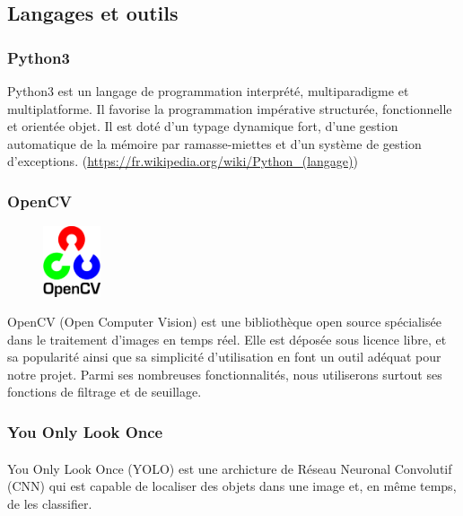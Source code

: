 \documentclass[a4paper]{article}
\begin{document}
		\subsection{Langages et outils}
			\subsubsection{Python3}
				Python3 est un langage de programmation interprété, multiparadigme et multiplatforme. Il favorise la programmation impérative structurée, fonctionnelle et orientée objet. Il est doté d'un typage dynamique fort, d'une gestion automatique de la mémoire par ramasse-miettes et d'un système de gestion d'exceptions. (\url{https://fr.wikipedia.org/wiki/Python_(langage)})

			\subsubsection{OpenCV}
				\begin{figure}
					\includegraphics[width=0.15\textwidth]{OpenCV.png}
				\end{figure}
				OpenCV (Open Computer Vision) est une bibliothèque open source spécialisée dans le traitement d'images en temps réel.
				Elle est déposée sous licence libre, et sa popularité ainsi que sa simplicité d'utilisation en font un outil adéquat pour notre projet.
				Parmi ses nombreuses fonctionnalités, nous utiliserons surtout ses fonctions de filtrage et de seuillage.
				
				\newline
			\subsubsection{You Only Look Once}
				\paragraph{}
				You Only Look Once (YOLO) est une archicture de Réseau Neuronal Convolutif (CNN) qui est capable de localiser des objets dans une image et, en même temps, de les classifier.
\end{document}
